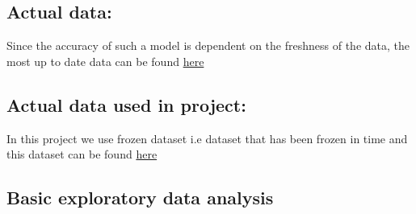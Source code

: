 \documentclass{article}
\begin{document}
\subsection{Actual data:}
Since the accuracy of such a model is dependent on the freshness of the data, the most up to date data can be found \href{https://www.kaggle.com/c/covid19-global-forecasting-week-5/overview}{here}

\subsection{Actual data used in project:}
In this project we use frozen dataset i.e dataset that has been frozen in time and this dataset can be found \href{https://github.com/acquayefrank/MLDM2020-Project/tree/master/data}{here}

\subsection{Basic exploratory data analysis}
\end{document}

